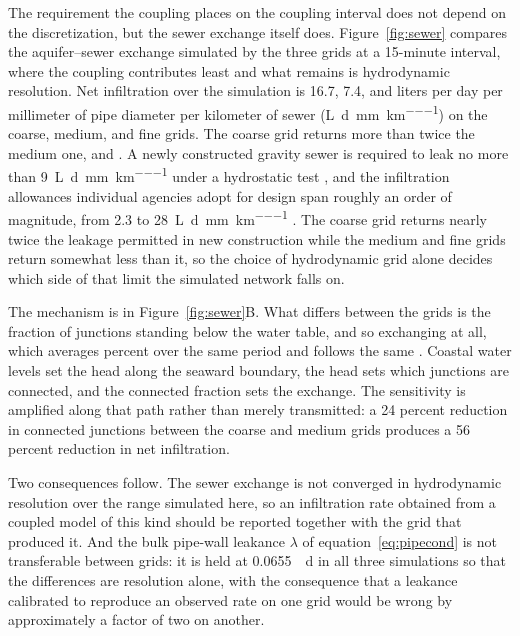 \documentclass[preprint,authoryear,11pt]{elsarticle}
\begin{document}
The requirement the coupling places on the coupling interval does not depend on the discretization, but the sewer exchange itself does. Figure~\ref{fig:sewer} compares the aquifer--sewer exchange simulated by the three grids at a 15-minute interval, where the coupling contributes least and what remains is hydrodynamic resolution. Net infiltration over the simulation is 16.7, 7.4, and  liters per day per millimeter of pipe diameter per kilometer of sewer (\si{\liter\per\day\per\milli\meter\per\kilo\meter}) on the coarse, medium, and fine grids. The coarse grid returns more than twice the medium one, and . A newly constructed gravity sewer is required to leak no more than \SI{9}{\liter\per\day\per\milli\meter\per\kilo\meter} under a hydrostatic test \citep[100 gallons per day per inch of diameter per mile, Paragraph 33.94 of][]{glumrb2014wastewater}, and the infiltration allowances individual agencies adopt for design span roughly an order of magnitude, from 2.3 to \SI{28}{\liter\per\day\per\milli\meter\per\kilo\meter} \citep[Table 3-8 of][]{asce2007gravity}. The coarse grid returns nearly twice the leakage permitted in new construction while the medium and fine grids return somewhat less than it, so the choice of hydrodynamic grid alone decides which side of that limit the simulated network falls on.

The mechanism is in Figure~\ref{fig:sewer}B. What differs between the grids is the fraction of junctions standing below the water table, and so exchanging at all, which averages  percent over the same period and follows the same . Coastal water levels set the head along the seaward boundary, the head sets which junctions are connected, and the connected fraction sets the exchange. The sensitivity is amplified along that path rather than merely transmitted: a 24 percent reduction in connected junctions between the coarse and medium grids produces a 56 percent reduction in net infiltration.

Two consequences follow. The sewer exchange is not converged in hydrodynamic resolution over the range simulated here, so an infiltration rate obtained from a coupled model of this kind should be reported together with the grid that produced it. And the bulk pipe-wall leakance $\lambda$ of equation~\ref{eq:pipecond} is not transferable between grids: it is held at \SI{0.0655}{\per\day} in all three simulations so that the differences are resolution alone, with the consequence that a leakance calibrated to reproduce an observed rate on one grid would be wrong by approximately a factor of two on another.
\end{document}
